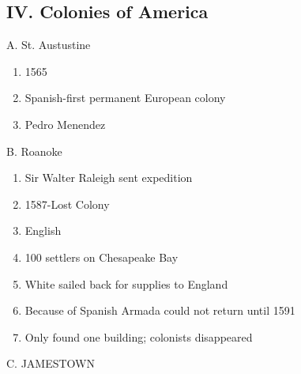 \documentclass{article}
\begin{document}
\subsection*{IV. Colonies of America}

\noindent A. St. Austustine

\begin{enumerate}
    \item 1565
    \item Spanish-first permanent European colony
    \item Pedro Menendez
\end{enumerate}

\noindent B. Roanoke

\begin{enumerate}
    \item Sir Walter Raleigh sent expedition
    \item 1587-Lost Colony
    \item English
    \item 100 settlers on Chesapeake Bay
    \item White sailed back for supplies to England
    \item Because of Spanish Armada could not return until 1591
    \item Only found one building; colonists disappeared
\end{enumerate}

\noindent C. JAMESTOWN
\end{document}
